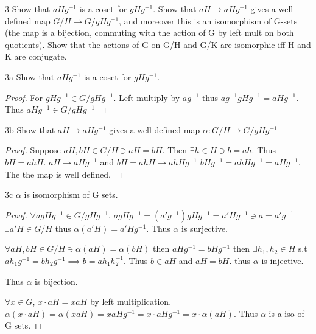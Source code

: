 \documentclass{article}
\begin{document}
\bigskip

\begin{PROB}{3}\label{Problem 3.}
    Show that $aHg^{-1}$ is a coset for $gHg^{-1}$.  Show that $aH \to aHg^{-1}$ gives a well defined map $G/H  \to G/gHg^{-1}$, and moreover this is an isomorphism of G-sets (the map is a bijection, commuting with the action of G by left mult on both quotients).   Show that the actions of G on G/H and G/K are isomorphic iff H and K are conjugate. 
\end{PROB}
\begin{claim}{3a}
    Show that $aHg^{-1}$ is a coset for $gHg^{-1}$.
\end{claim}
\begin{proof}
    For $gHg^{-1} \in G/gHg^{-1}$. Left multiply by $ag^{-1}$ thus $ag^{-1} gHg^{-1} = aHg^{-1}$. Thus $aHg^{-1} \in G/gHg^{-1}$
\end{proof}

\begin{claim}{3b}
    Show that $aH \to aHg^{-1}$ gives a well defined map $\alpha: G/H \to G/gHg^{-1}$
\end{claim}
\begin{proof}
    Suppose $aH, bH \in G/H \ni aH = bH$. Then $\exists h \in H \ni b = ah$. Thus $bH = ahH$. $aH \to aHg^{-1}$ and $bH = ahH \to ahHg^{-1}$ $bHg^{-1} = ahHg^{-1} = aHg^{-1}$. The the map is well defined.
\end{proof}

\begin{claim}{3c}
    $\alpha$ is isomorphism of G sets.
\end{claim}
\begin{proof}
    $\forall agHg^{-1} \in G/gHg^{-1}$, $agHg^{-1} = (a'g^{-1})gHg^{-1} = a'Hg^{-1} \ni a = a'g^{-1}$ $\exists a'H \in G/H$ thus $\alpha(a'H) = a'Hg^{-1}$. Thus $\alpha$ is surjective.

    $\forall aH, bH \in G/H \ni \alpha(aH) = \alpha(bH)$ then $aHg^{-1} = bHg^{-1}$ then $\exists h_1, h_2 \in H$ s.t $ah_1g^{-1} = bh_2g^{-1} \implies b = ah_1h_2^{-1}$. Thus $b \in aH$ and $aH = bH$. thus $\alpha$ is injective.

    Thus $\alpha$ is bijection.

    $\forall x \in G$, $x \cdot aH = xaH$ by left multiplication. $\alpha(x \cdot aH) = \alpha(xaH) = xaHg^{-1} = x \cdot aHg^{-1} = x \cdot \alpha(aH)$. Thus $\alpha$ is a iso of G sets.
\end{proof}
\end{document}
